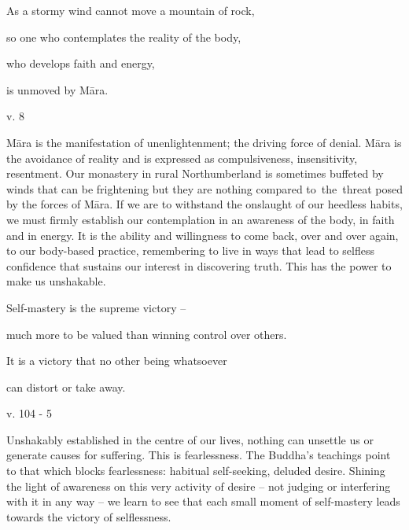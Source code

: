 \documentclass[a4paper,portrait,12pt]{article}
\begin{document}
As a stormy wind cannot move a mountain of rock,


so one who contemplates the reality of the body,


who develops faith and energy,


is unmoved by Māra.





v. 8 





Māra is the manifestation of unenlightenment; the driving force of denial. Māra is the avoidance of reality and is expressed as compulsiveness, insensitivity, resentment. Our monastery in rural Northumberland is sometimes buffeted by winds that can be frightening but they are nothing compared to the threat posed by the forces of Māra. If we are to withstand the onslaught of our heedless habits, we must firmly establish our contemplation in an awareness of the body, in faith and in energy. It is the ability and willingness to come back, over and over again, to our body-based practice, remembering to live in ways that lead to selfless confidence that sustains our interest in discovering truth. This has the power to make us unshakable.














Self-mastery is the supreme victory --


much more to be valued than winning control over others.


It is a victory that no other being whatsoever


can distort or take away.





v. 104 - 5





Unshakably established in the centre of our lives, nothing can unsettle us or generate causes for suffering. This is fearlessness. The Buddha's teachings point to that which blocks fearlessness: habitual self-seeking, deluded desire. Shining the light of awareness on this very activity of desire -- not judging or interfering with it in any way -- we learn to see that each small moment of self-mastery leads towards the victory of selflessness.
\end{document}
